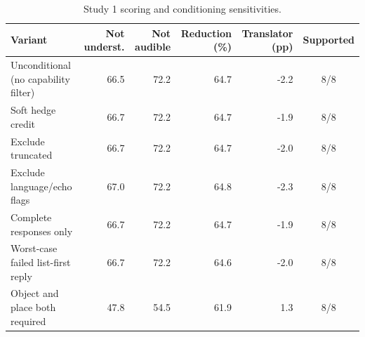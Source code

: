 \documentclass[11pt]{article}
\begin{document}
\begin{table}[!tp]
\centering\setlength{\tabcolsep}{4.5pt}\small
\begin{tabular*}{\linewidth}{@{\extracolsep{\fill}}lrrrrc@{}}
\toprule
\textbf{Variant} & \textbf{Not underst.} & \textbf{Not audible} & \textbf{Reduction (\%)} & \textbf{Translator (pp)} & \textbf{Supported}\\
\midrule
Unconditional (no capability filter) & 66.5 & 72.2 & 64.7 & -2.2 & 8/8\\
Soft hedge credit & 66.7 & 72.2 & 64.7 & -1.9 & 8/8\\
Exclude truncated & 66.7 & 72.2 & 64.7 & -2.0 & 8/8\\
Exclude language/echo flags & 67.0 & 72.2 & 64.8 & -2.3 & 8/8\\
Complete responses only & 66.7 & 72.2 & 64.7 & -1.9 & 8/8\\
Worst-case failed list-first reply & 66.7 & 72.2 & 64.6 & -2.0 & 8/8\\
Object and place both required & 47.8 & 54.5 & 61.9 & 1.3 & 8/8\\
\bottomrule
\end{tabular*}
\caption{Study 1 scoring and conditioning sensitivities.}
\label{tab:s1sens}
\end{table}
\end{document}
